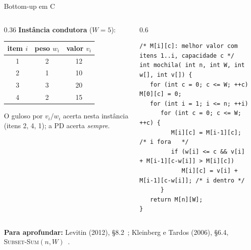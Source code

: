 \documentclass[aspectratio=169,xcolor=table]{beamer}
\newcommand{\fonte}[1]{%
  \vfill
  {\tiny\color{gray!55!black}\textbf{Para aprofundar:} #1\par}%
}
\begin{document}
\begin{frame}[fragile]{Bottom-up em C}
  \begin{columns}[T]
    \begin{column}{0.36\textwidth}
      \scriptsize \textbf{Instância condutora} ($W=5$):\\[3pt]
      \centering
      \begin{tabular}{ccc}
        \toprule
        item $i$ & peso $w_i$ & valor $v_i$ \\
        \midrule
        1 & 2 & 12 \\
        2 & 1 & 10 \\
        3 & 3 & 20 \\
        4 & 2 & 15 \\
        \bottomrule
      \end{tabular}
      \medskip

      \raggedright
      O guloso por $v_i/w_i$ acerta nesta instância (itens 2, 4, 1); a PD acerta
      \emph{sempre}.
    \end{column}
    \begin{column}{0.6\textwidth}
\begin{lstlisting}[basicstyle=\ttfamily\tiny]
/* M[i][c]: melhor valor com itens 1..i, capacidade c */
int mochila( int n, int W, int w[], int v[]) {
   for (int c = 0; c <= W; ++c) M[0][c] = 0;
   for (int i = 1; i <= n; ++i)
      for (int c = 0; c <= W; ++c) {
         M[i][c] = M[i-1][c];              /* i fora   */
         if (w[i] <= c && v[i] + M[i-1][c-w[i]] > M[i][c])
            M[i][c] = v[i] + M[i-1][c-w[i]]; /* i dentro */
      }
   return M[n][W];
}
\end{lstlisting}
    \end{column}
  \end{columns}
  \fonte{Levitin (2012), \S 8.2~\cite{levitin2012introduction};
    Kleinberg e Tardos (2006), \S 6.4, \textsc{Subset-Sum}$(n,W)$~\cite{kleinberg2006algorithm}.}
\end{frame}
\end{document}
